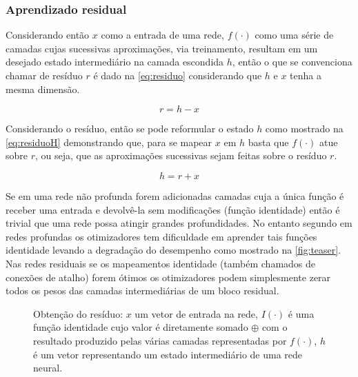 			\subsubsection{Aprendizado residual}
			
				\par Considerando então $x$ como a entrada de uma rede, $f(\cdot)$ como uma série de camadas cujas sucessivas aproximações, via treinamento, resultam em um desejado  estado intermediário na camada escondida $h$, então o que se convenciona chamar de resíduo $r$ é dado na \autoref{eq:residuo} considerando que $h$ e $x$ tenha a mesma dimensão.
				
				
				\begin{equation}
					\label{eq:residuo}
					r = h - x
				\end{equation}
			
				\par Considerando o resíduo, então se pode reformular o estado $h$ como mostrado na \autoref{eq:residuoH} demonstrando que, para se mapear $x$ em $h$ basta que $f(\cdot)$ atue sobre $r$, ou seja, que as aproximações sucessivas sejam feitas sobre o resíduo $r$.
				
				\begin{equation}
					\label{eq:residuoH}
					h = r + x
				\end{equation}
			
				\par Se em uma rede não profunda forem adicionadas camadas cuja a única função é receber uma entrada e devolvê-la sem modificações (função identidade) então é trivial que uma rede possa atingir grandes profundidades. No entanto segundo \cite{DBLP:journals/corr/HeZRS15} em redes profundas os otimizadores tem dificuldade em aprender tais funções identidade levando a degradação do desempenho como mostrado na \autoref{fig:teaser}. Nas redes residuais se os mapeamentos identidade (também chamados de conexões de atalho) forem ótimos os otimizadores podem simplesmente zerar todos os pesos das camadas intermediárias de um bloco residual.
				

				\begin{figure}[h]
					\centering
					\caption[Obtenção do resíduo]{Obtenção do resíduo: $x$ um vetor de entrada na rede, $I(\cdot)$ é uma função identidade cujo valor é diretamente somado $\oplus$ com o resultado produzido pelas várias camadas representadas por $f(\cdot)$, $h$ é um vetor representando um estado intermediário de uma rede neural.}
					
					\label{fig:residuo}
				\end{figure}
			
